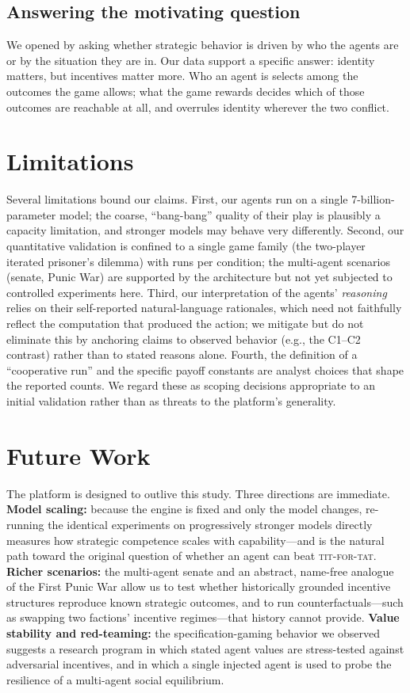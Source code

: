 \subsection{Answering the motivating question}
We opened by asking whether strategic behavior is driven by who the agents are or by the situation they are in. Our data support a specific answer: identity matters, but incentives matter more. Who an agent is selects among the outcomes the game allows; what the game rewards decides which of those outcomes are reachable at all, and overrules identity wherever the two conflict.

\section{Limitations}
\label{sec:limitations}

Several limitations bound our claims. First, our agents run on a single 7-billion-parameter model; the coarse, ``bang-bang'' quality of their play is plausibly a capacity limitation, and stronger models may behave very differently. Second, our quantitative validation is confined to a single game family (the two-player iterated prisoner's dilemma) with  runs per condition; the multi-agent scenarios (senate, Punic War) are supported by the architecture but not yet subjected to controlled experiments here. Third, our interpretation of the agents' \emph{reasoning} relies on their self-reported natural-language rationales, which need not faithfully reflect the computation that produced the action; we mitigate but do not eliminate this by anchoring claims to observed behavior (e.g., the C1--C2 contrast) rather than to stated reasons alone. Fourth, the definition of a ``cooperative run'' and the specific payoff constants are analyst choices that shape the reported counts. We regard these as scoping decisions appropriate to an initial validation rather than as threats to the platform's generality.

\section{Future Work}
\label{sec:future}

The platform is designed to outlive this study. Three directions are immediate. \textbf{Model scaling:} because the engine is fixed and only the model changes, re-running the identical experiments on progressively stronger models directly measures how strategic competence scales with capability---and is the natural path toward the original question of whether an agent can beat \textsc{tit-for-tat}. \textbf{Richer scenarios:} the multi-agent senate and an abstract, name-free analogue of the First Punic War allow us to test whether historically grounded incentive structures reproduce known strategic outcomes, and to run counterfactuals---such as swapping two factions' incentive regimes---that history cannot provide. \textbf{Value stability and red-teaming:} the specification-gaming behavior we observed suggests a research program in which stated agent values are stress-tested against adversarial incentives, and in which a single injected agent is used to probe the resilience of a multi-agent social equilibrium.

